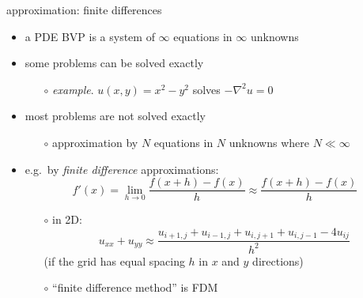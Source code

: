 \documentclass[hide notes,intlimits,usenames,dvipsnames]{beamer}
\newcommand{\grad}{\nabla}
\begin{document}
\begin{frame}{approximation: finite differences}
\begin{itemize}
\item a PDE BVP is a system of $\infty$ equations in $\infty$ unknowns
\item some problems can be solved exactly
	\begin{itemize}
	\item[$\circ$] \emph{example}.  $u(x,y)=x^2-y^2$ solves $-\grad^2 u = 0$
	\end{itemize}
\item most problems are not solved exactly
	\begin{itemize}
	\item[$\circ$] approximation by $N$ equations in $N$ unknowns where $N \ll \infty$
	\end{itemize}
\item e.g.~by \emph{finite difference} approximations:
	    $$f'(x) = \lim_{h \to 0} \frac{f(x+h)-f(x)}{h} \approx \frac{f(x+h)-f(x)}{h}$$
	\begin{itemize}
    \vspace{-5mm}
	\item[$\circ$] in 2D:
	    $$u_{xx}+u_{yy} \approx \frac{u_{i+1,j} + u_{i-1,j} + u_{i,j+1} + u_{i,j-1} - 4 u_{ij}}{h^2}$$
	(if the grid has equal spacing $h$ in $x$ and $y$ directions)
	\item[$\circ$] ``finite difference method'' is FDM
	\end{itemize}
\end{itemize}
\end{frame}
\end{document}
